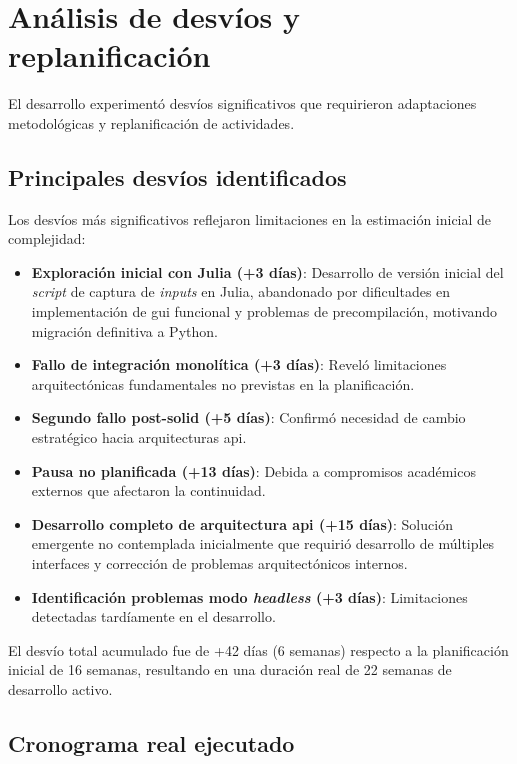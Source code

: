 \section{Análisis de desvíos y replanificación}
\label{sec:desvios_replanificacion}

El desarrollo experimentó desvíos significativos que requirieron adaptaciones metodológicas y replanificación de actividades.

\subsection{Principales desvíos identificados}
\label{subsec:principales_desvios}

Los desvíos más significativos reflejaron limitaciones en la estimación inicial de complejidad:

\begin{itemize}
    \item \textbf{Exploración inicial con Julia (+3 días)}: Desarrollo de versión inicial del \textit{script} de captura de \textit{inputs} en Julia, abandonado por dificultades en implementación de \acrshort{gui} funcional y problemas de precompilación, motivando migración definitiva a Python.
    \item \textbf{Fallo de integración monolítica (+3 días)}: Reveló limitaciones arquitectónicas fundamentales no previstas en la planificación.
    \item \textbf{Segundo fallo post-\acrshort{solid} (+5 días)}: Confirmó necesidad de cambio estratégico hacia arquitecturas \acrshort{api}.
    \item \textbf{Pausa no planificada (+13 días)}: Debida a compromisos académicos externos que afectaron la continuidad.
    \item \textbf{Desarrollo completo de arquitectura \acrshort{api} (+15 días)}: Solución emergente no contemplada inicialmente que requirió desarrollo de múltiples interfaces y corrección de problemas arquitectónicos internos.
    \item \textbf{Identificación problemas modo \textit{\gls{headless}} (+3 días)}: Limitaciones detectadas tardíamente en el desarrollo.
\end{itemize}

El desvío total acumulado fue de +42 días (6 semanas) respecto a la planificación inicial de 16 semanas, resultando en una duración real de 22 semanas de desarrollo activo.

\subsection{Cronograma real ejecutado}
\label{subsec:cronograma_real}

